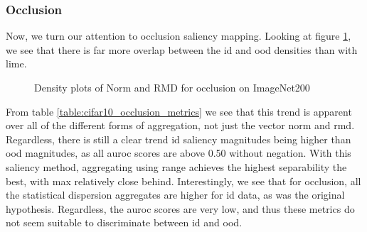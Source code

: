 \documentclass[UKenglish]{uiomasterthesis} %
\theoremstyle{definition}
\begin{document}
\subsubsection{Occlusion}

Now, we turn our attention to occlusion saliency mapping. Looking at figure \ref{fig:imagenet200_occlusion_mean_rmd}, we see that there is far more overlap between the \ac{id} and \ac{ood} densities than with \ac{lime}.

\begin{figure}[hbtp]
    \begin{center}
        
    \end{center}
    \caption[Density plots of Norm and RMD for occlusion on ImageNet200]{Density plots of Norm and RMD for occlusion on ImageNet200}
    \label{fig:imagenet200_occlusion_mean_rmd}
\end{figure}

From table \ref{table:cifar10_occlusion_metrics} we see that this trend is apparent over all of the different forms of aggregation, not just the vector norm and \ac{rmd}. Regardless, there is still a clear trend \ac{id} saliency magnitudes being higher than \ac{ood} magnitudes, as all \ac{auroc} scores are above 0.50 without negation. With this saliency method, aggregating using range achieves the highest separability the best, with max relatively close behind. Interestingly, we see that for occlusion, all the statistical dispersion aggregates are higher for \ac{id} data, as was the original hypothesis. Regardless, the \ac{auroc} scores are very low, and thus these metrics do not seem suitable to discriminate between \ac{id} and \ac{ood}.
\end{document}
